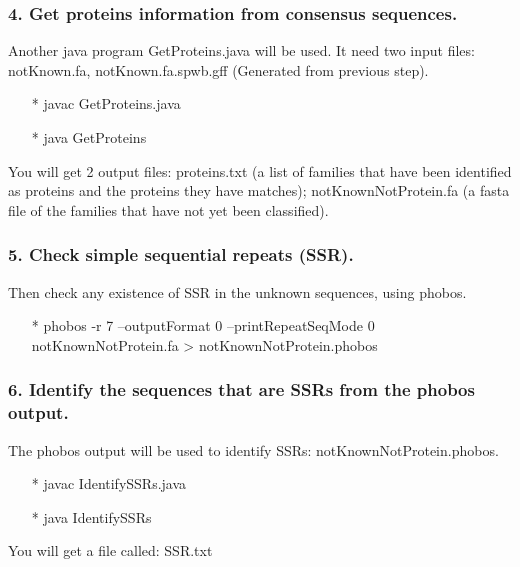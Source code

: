 \documentclass[12pt]{report}
\begin{document}
\subsubsection{4. Get proteins information from consensus sequences.}
Another java program GetProteins.java will be used. It need two input files: notKnown.fa, notKnown.fa.spwb.gff (Generated from previous step).
\begin{enumerate}
	\item[*] javac GetProteins.java
	\item[*] java GetProteins
\end{enumerate}
You will get 2 output files: proteins.txt (a list of families that have been identified as proteins and the proteins they have matches);
notKnownNotProtein.fa (a fasta file of the families that have not yet been classified).

\subsubsection{5. Check simple sequential repeats (SSR).}
Then check any existence of SSR in the unknown sequences, using phobos.
\begin{enumerate}
	\item[*] phobos -r 7 --outputFormat 0 --printRepeatSeqMode 0 notKnownNotProtein.fa > notKnownNotProtein.phobos
\end{enumerate}

\subsubsection{6. Identify the sequences that are SSRs from the phobos output.}
The phobos output will be used to identify SSRs: notKnownNotProtein.phobos.
\begin{enumerate}
	\item[*] javac IdentifySSRs.java
	\item[*] java IdentifySSRs
\end{enumerate}
You will get a file called: SSR.txt
\end{document}
